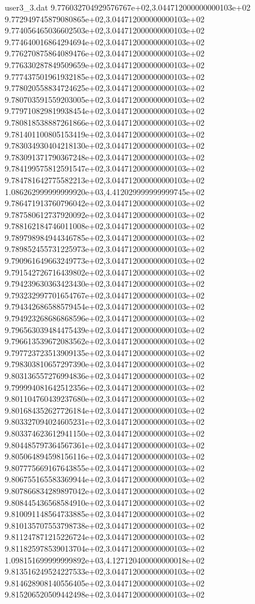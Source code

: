 \begin{filecontents}{user3_3.dat}
9.776032704929576767e+02,3.044712000000000103e+02
9.772949745879080865e+02,3.044712000000000103e+02
9.774056465036602503e+02,3.044712000000000103e+02
9.774640016864294694e+02,3.044712000000000103e+02
9.776270875864089476e+02,3.044712000000000103e+02
9.776330287849509659e+02,3.044712000000000103e+02
9.777437501961932185e+02,3.044712000000000103e+02
9.778020558834724625e+02,3.044712000000000103e+02
9.780703591559203005e+02,3.044712000000000103e+02
9.779710829819938454e+02,3.044712000000000103e+02
9.780818538887261866e+02,3.044712000000000103e+02
9.781401100805153419e+02,3.044712000000000103e+02
9.783034930404218130e+02,3.044712000000000103e+02
9.783091371790367248e+02,3.044712000000000103e+02
9.784199575812591547e+02,3.044712000000000103e+02
9.784781642775582213e+02,3.044712000000000103e+02
1.086262999999999920e+03,4.412029999999999745e+02
9.786471913760796042e+02,3.044712000000000103e+02
9.787580612737920092e+02,3.044712000000000103e+02
9.788162184746011008e+02,3.044712000000000103e+02
9.789798984944346785e+02,3.044712000000000103e+02
9.789852455731225973e+02,3.044712000000000103e+02
9.790961649663249773e+02,3.044712000000000103e+02
9.791542726716439802e+02,3.044712000000000103e+02
9.794239630363423430e+02,3.044712000000000103e+02
9.793232997701654767e+02,3.044712000000000103e+02
9.794342686588579454e+02,3.044712000000000103e+02
9.794923268686868596e+02,3.044712000000000103e+02
9.796563039484475439e+02,3.044712000000000103e+02
9.796613539672083562e+02,3.044712000000000103e+02
9.797723723513909135e+02,3.044712000000000103e+02
9.798303810657297390e+02,3.044712000000000103e+02
9.803136557276994836e+02,3.044712000000000103e+02
9.799994081642512356e+02,3.044712000000000103e+02
9.801104760439237680e+02,3.044712000000000103e+02
9.801684352627726184e+02,3.044712000000000103e+02
9.803327094024605231e+02,3.044712000000000103e+02
9.803374623612941150e+02,3.044712000000000103e+02
9.804485797364567361e+02,3.044712000000000103e+02
9.805064894598156116e+02,3.044712000000000103e+02
9.807775669167643855e+02,3.044712000000000103e+02
9.806755165583369944e+02,3.044712000000000103e+02
9.807866834289897042e+02,3.044712000000000103e+02
9.808445436568584910e+02,3.044712000000000103e+02
9.810091148564733885e+02,3.044712000000000103e+02
9.810135707553798738e+02,3.044712000000000103e+02
9.811247871215226724e+02,3.044712000000000103e+02
9.811825978539013704e+02,3.044712000000000103e+02
1.098151699999999892e+03,4.127120400000000018e+02
9.813516249524227533e+02,3.044712000000000103e+02
9.814628908140556405e+02,3.044712000000000103e+02
9.815206520509442498e+02,3.044712000000000103e+02

\end{filecontents}
